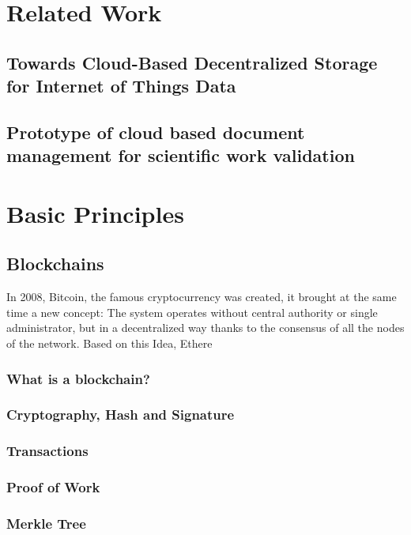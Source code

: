 \section{Related Work}


\subsection{Towards Cloud-Based Decentralized Storage for Internet of Things Data}
\subsection{Prototype of cloud based document management for scientific work validation}

\section{Basic Principles}

\subsection{Blockchains}
In 2008, Bitcoin, the famous cryptocurrency was created, it brought at the same time a new concept: The system operates without central authority or single administrator, but in a decentralized way thanks to the consensus of all the nodes of the network. Based on this Idea, Ethere
\subsubsection{What is a blockchain?}
\subsubsection{Cryptography, Hash and Signature}
\subsubsection{Transactions}
\subsubsection{Proof of Work}
\subsubsection{Merkle Tree}
